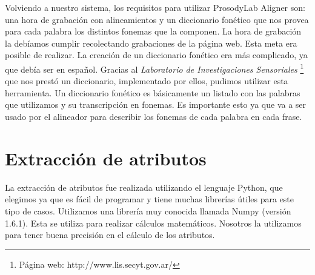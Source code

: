 Volviendo a nuestro sistema, los requisitos para utilizar ProsodyLab Aligner son: una hora de grabación con alineamientos y un diccionario fonético que nos provea para cada palabra los distintos fonemas que la componen. La hora de grabación la debíamos cumplir recolectando grabaciones de la página web. Esta meta era posible de realizar. La creación de un diccionario fonético era más complicado, ya que debía ser en español. Gracias al \textit{Laboratorio de Investigaciones Sensoriales} \footnote{Página web: http://www.lis.secyt.gov.ar/} que nos prestó un diccionario, implementado por ellos, pudimos utilizar esta herramienta. Un diccionario fonético es básicamente un listado con las palabras que utilizamos y su transcripción en fonemas. Es importante esto ya que va a ser usado por el alineador para describir los fonemas de cada palabra en cada frase.



\section{Extracción de atributos}

La extracción de atributos fue realizada utilizando el lenguaje Python, que elegimos ya que es fácil de programar y tiene muchas librerías útiles para este tipo de casos. Utilizamos una librería muy conocida llamada Numpy (versión 1.6.1). Esta se utiliza para realizar cálculos matemáticos. Nosotros la utilizamos para tener buena precisión en el cálculo de los atributos.

